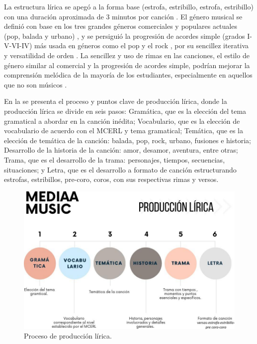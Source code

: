 \documentclass[spanish]{textolivre}
\begin{document}
La estructura lírica se apegó a la forma base (estrofa, estribillo, estrofa, estribillo) con una duración aproximada de 3 minutos por canción \cite{martinez2017}. El género musical se definió con base en los tres grandes géneros comerciales y populares actuales (pop, balada y urbano) \cite{sinaga2019learning}, y se persiguió la progresión de acordes simple (grados I-V-VI-IV) más usada en géneros como el pop y el rock \cite{martinez2017}, por su sencillez iterativa y versatilidad de orden \cite{kim2014melody}. La sencillez y uso de rimas en las canciones, el estilo de género similar al comercial y la progresión de acordes simple, podrían mejorar la comprensión melódica de la mayoría de los estudiantes, especialmente en aquellos que no son músicos \cite{chiang2018language}.

En la  se presenta el proceso y puntos clave de producción lírica, donde la producción lírica se divide en seis pasos: Gramática, que es la elección del tema gramatical a abordar en la canción inédita; Vocabulario, que es la elección de vocabulario de acuerdo con el MCERL y tema gramatical; Temática, que es la elección de temática de la canción: balada, pop, rock, urbano, fusiones e historia; Desarrollo de la historia de la canción: amor, desamor, aventura, entre otras; Trama, que es el desarrollo de la trama: personajes, tiempos, secuencias, situaciones; y Letra, que es el desarrollo a formato de canción estructurando estrofas, estribillos, pre-coro, coros, con sus respectivas rimas y versos.

\begin{figure}[h!]
\centering
\begin{minipage}{.8\textwidth}
 \includegraphics[width=\textwidth]{image1.jpg}
 \caption{Proceso de producción lírica.}
 \label{fig1}
\end{minipage}
\end{figure}
\end{document}
